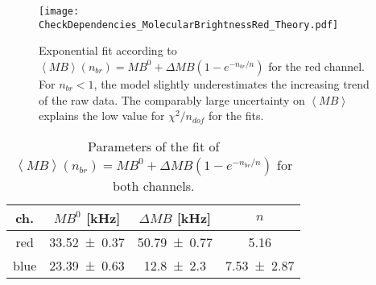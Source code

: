 \vfill
\begin{figure}[h]
	\centering
	\texttt{[image: CheckDependencies\_MolecularBrightnessRed\_Theory.pdf]}
	\caption[Exponential fit of molecular brightness for red channel]{Exponential fit according to $\left\langle MB \right\rangle (n_{br}) = MB^0 + \Delta MB(1 - e^{-n_{br}/ n})$ for the red channel. For ${n_{br} < 1}$, the model  slightly underestimates the increasing trend of the raw data. The comparably large uncertainty on $\left\langle MB \right\rangle$ explains the low value for $\chi^2/ n_{dof}$ for the fits.}
	\label{fig:CheckDependencies_MolecularBrightnessRed_Theory}
\end{figure}
\vfill
\begin{table}[h]
	\centering
	\begin{tabular}{c|c|c|c} 
		ch. & $MB^0$ [\si{\kilo\hertz}] & $\Delta MB$ [\si{\kilo\hertz}] & $n$ \\
		\hline
		red & \num{33.52 +- 0.37} & \num{50.79 +- 0.77} & \num{5.16} \\
		blue & \num{23.39 +- 0.63} & \num{12.8 +- 2.3} & \num{7.53 +- 2.87} \\
	\end{tabular}
	\caption[Parameters of exponential fit of molecular brightness]{Parameters of the fit of $\left\langle MB \right\rangle (n_{br}) = MB^0 + \Delta MB(1 - e^{-n_{br}/ n})$ for both channels.}
	\label{Table:MolecularBrightnessTheory}
\end{table}

\clearpage


